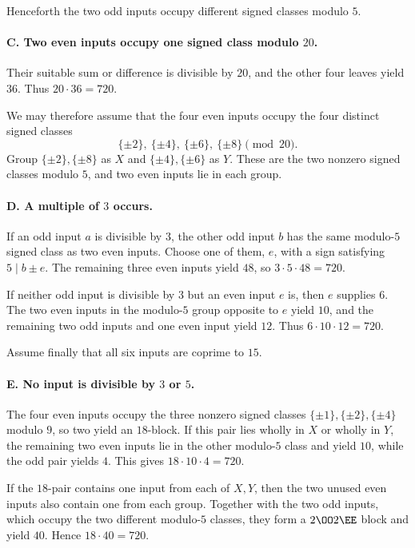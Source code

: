 Henceforth the two odd inputs occupy different signed classes modulo $5$.

\paragraph{C. Two even inputs occupy one signed class modulo $20$.}
Their suitable sum or difference is divisible by $20$, and the other four
leaves yield $36$.  Thus $20\cdot36=720$.

We may therefore assume that the four even inputs occupy the four distinct
signed classes
\[
 \{\pm2\},\ \{\pm4\},\ \{\pm6\},\ \{\pm8\}\pmod{20}.
\]
Group $\{\pm2\},\{\pm8\}$ as $X$ and
$\{\pm4\},\{\pm6\}$ as $Y$.  These are the two nonzero signed classes
modulo $5$, and two even inputs lie in each group.

\paragraph{D. A multiple of $3$ occurs.}
If an odd input $a$ is divisible by $3$, the other odd input $b$ has the same
modulo-$5$ signed class as two even inputs.  Choose one of them, $e$, with a
sign satisfying $5\mid b\pm e$.  The remaining three even inputs yield $48$,
so $3\cdot5\cdot48=720$.

If neither odd input is divisible by $3$ but an even input $e$ is, then $e$
supplies $6$.  The two even inputs in the modulo-$5$ group opposite to $e$
yield $10$, and the remaining two odd inputs and one even input yield $12$.
Thus $6\cdot10\cdot12=720$.

Assume finally that all six inputs are coprime to $15$.

\paragraph{E. No input is divisible by $3$ or $5$.}
The four even inputs occupy the three nonzero signed classes
$\{\pm1\},\{\pm2\},\{\pm4\}$ modulo $9$, so two yield an $18$-block.
If this pair lies wholly in $X$ or wholly in $Y$, the remaining two even
inputs lie in the other modulo-$5$ class and yield $10$, while the odd pair
yields $4$.  This gives $18\cdot10\cdot4=720$.

If the $18$-pair contains one input from each of $X,Y$, then the two unused
even inputs also contain one from each group.  Together with the two odd
inputs, which occupy the two different modulo-$5$ classes, they form a
$2\OO2\EE$ block and yield $40$.  Hence $18\cdot40=720$.

